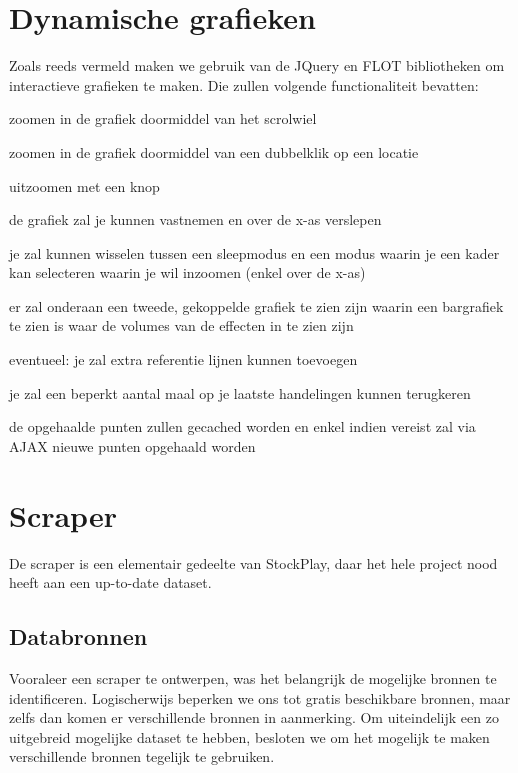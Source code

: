 %
%


\chapter{Dynamische grafieken}

Zoals reeds vermeld maken we gebruik van de JQuery en FLOT bibliotheken om interactieve grafieken te maken. Die zullen volgende functionaliteit bevatten:
\begin{itemize_compact}
\item{zoomen in de grafiek doormiddel van het scrolwiel}
\item{zoomen in de grafiek doormiddel van een dubbelklik op een locatie}
\item{uitzoomen met een knop}
\item{de grafiek zal je kunnen vastnemen en over de x-as verslepen}
\item{je zal kunnen wisselen tussen een sleepmodus en een modus waarin je een kader kan selecteren waarin je wil inzoomen (enkel over de x-as)}
\item{er zal onderaan een tweede, gekoppelde grafiek te zien zijn waarin een bargrafiek te zien is waar de volumes van de effecten in te zien zijn}
\item{eventueel: je zal extra referentie lijnen kunnen toevoegen}
\item{je zal een beperkt aantal maal op je laatste handelingen kunnen terugkeren}
\item{de opgehaalde punten zullen gecached worden en enkel indien vereist zal via AJAX nieuwe punten opgehaald worden}
\end{itemize_compact}


%
%

\chapter{Scraper}

De scraper is een elementair gedeelte van StockPlay, daar het hele project nood heeft aan een up-to-date dataset.

\section{Databronnen}

Vooraleer een scraper te ontwerpen, was het belangrijk de mogelijke bronnen te identificeren. Logischerwijs beperken we ons tot gratis beschikbare bronnen, maar zelfs dan komen er verschillende bronnen in aanmerking. Om uiteindelijk een zo uitgebreid mogelijke dataset te hebben, besloten we om het mogelijk te maken verschillende bronnen tegelijk te gebruiken.

